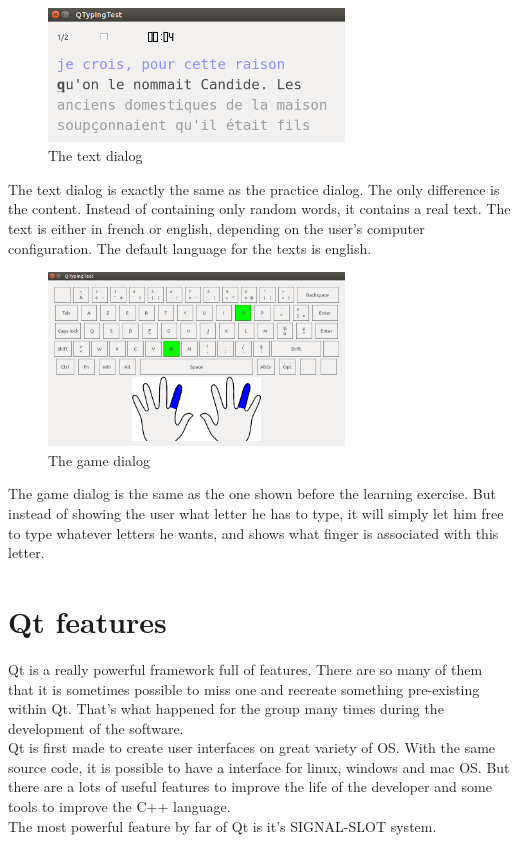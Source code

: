 \begin{figure}[H]
	\centering
	\includegraphics[width=0.7\textwidth]{images/dialog-text.png}
	 \caption{The text dialog}
	 \label{dialog-text}
\end{figure}

The text dialog is exactly the same as the practice dialog. The only difference is the content. Instead of containing only random words, it contains a real text. The text is either in french or english, depending on the user's computer configuration. The default language for the texts is english.

\begin{figure}[H]
	\centering
	\includegraphics[width=0.7\textwidth]{images/dialog-game.png}
	 \caption{The game dialog}
	 \label{dialog-game}
\end{figure}

The game dialog is the same as the one shown before the learning exercise. But instead of showing the user what letter he has to type, it will simply let him free to type whatever letters he wants, and shows what finger is associated with this letter. \\


\section{Qt features}

Qt is a really powerful framework full of features. There are so many of them that it is sometimes possible to miss one and recreate something pre-existing within Qt. That's what happened for the group many times during the development of the software.\\
Qt is first made to create user interfaces on great variety of OS. With the same source code, it is possible to have a interface for linux, windows and mac OS. But there are a lots of useful features to improve the life of the developer and some tools to improve the C++ language.\\
The most powerful feature by far of Qt is it's SIGNAL-SLOT system.

